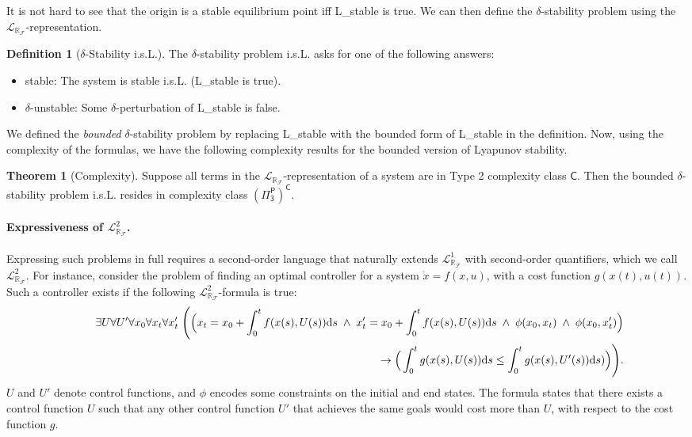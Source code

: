 \documentclass[10pt]{article}
\newcommand{\lrf}{\mathcal{L}_{\mathbb{R}_{\mathcal{F}}}}
\theoremstyle{definition}
\newtheorem{definition}{Definition}
\newtheorem{theorem}{Theorem}
\begin{document}
It is not hard to see that the origin is a stable equilibrium point iff {\sf L\_stable} is true. We can then define the $\delta$-stability problem using the $\lrf$-representation.  
\begin{definition}[$\delta$-Stability i.s.L.]\label{sl}
The $\delta$-stability problem i.s.L. asks for one of the following answers:
\begin{itemize}
\item {\sf stable}: The system is stable i.s.L. ({\sf L\_stable} is true). 
\item {\sf $\delta$-unstable}: Some $\delta$-perturbation of {\sf L\_stable} is false. 
\end{itemize}
\end{definition}
We defined the {\em bounded} $\delta$-stability problem by replacing {\sf L\_stable} with the bounded form of {\sf L\_stable} in the definition. Now, using the complexity of the formulas, we have the following complexity results for the bounded version of Lyapunov stability. 
\begin{theorem}[Complexity]
Suppose all terms in the $\lrf$-representation of a system are in Type 2 complexity class $\mathsf{C}$.  Then the bounded $\delta$-stability problem i.s.L. resides in complexity class $\mathsf{(\Pi^P_3)^C}$. 
\end{theorem}

\paragraph{Expressiveness of $\lrf^2$.} Expressing such problems in full requires a second-order language that naturally extends $\lrf^1$ with second-order quantifiers, which we call $\lrf^2$. For instance, consider the problem of finding an optimal controller for a system $\dot x = f({x}, u)$, with a cost function $g(x(t),u(t))$. Such a controller exists if the following $\lrf^2$-formula is true:
\begin{eqnarray*}
& &\exists U \forall U' \forall {x_0}\forall {x_t} \forall {x_t'} \;\Bigg( \Big({x_t} = {x_0} + \int_{0}^t f({x}(s),U(s))\mathrm{d}s \;\wedge\;  x_t' = x_0 + \int_{0}^t f(x(s),U(s))\mathrm{d}s
\;\wedge\; \phi(x_0, x_t) \;\wedge\; \phi(x_0, x_t')\Big)\\
& &\hspace{9.5cm} \rightarrow \Big(\int_0^t g(x(s),U(s))\mathrm{d}s \leq  \int_0^t g(x(s),U'(s))\mathrm{d}s)\Big) \Bigg).
\end{eqnarray*}
$U$ and $U'$ denote control functions, and $\phi$ encodes some constraints on the initial and end states. The formula states that there exists a control function $U$ such that any other control function $U'$ that achieves the same goals would cost more than $U$, with respect to the cost function $g$. 
\end{document}
